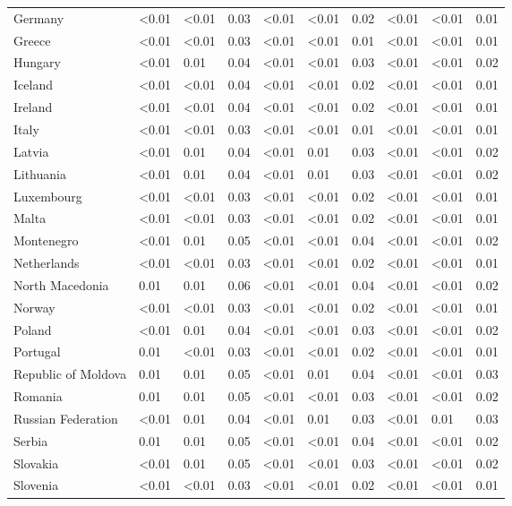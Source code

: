 \begin{longtable}[t]{llllllllll}
Germany & <0.01 & <0.01 & 0.03 & <0.01 & <0.01 & 0.02 & <0.01 & <0.01 & 0.01\\
Greece & <0.01 & <0.01 & 0.03 & <0.01 & <0.01 & 0.01 & <0.01 & <0.01 & 0.01\\
\addlinespace
Hungary & <0.01 & 0.01 & 0.04 & <0.01 & <0.01 & 0.03 & <0.01 & <0.01 & 0.02\\
Iceland & <0.01 & <0.01 & 0.04 & <0.01 & <0.01 & 0.02 & <0.01 & <0.01 & 0.01\\
Ireland & <0.01 & <0.01 & 0.04 & <0.01 & <0.01 & 0.02 & <0.01 & <0.01 & 0.01\\
Italy & <0.01 & <0.01 & 0.03 & <0.01 & <0.01 & 0.01 & <0.01 & <0.01 & 0.01\\
Latvia & <0.01 & 0.01 & 0.04 & <0.01 & 0.01 & 0.03 & <0.01 & <0.01 & 0.02\\
\addlinespace
Lithuania & <0.01 & 0.01 & 0.04 & <0.01 & 0.01 & 0.03 & <0.01 & <0.01 & 0.02\\
Luxembourg & <0.01 & <0.01 & 0.03 & <0.01 & <0.01 & 0.02 & <0.01 & <0.01 & 0.01\\
Malta & <0.01 & <0.01 & 0.03 & <0.01 & <0.01 & 0.02 & <0.01 & <0.01 & 0.01\\
Montenegro & <0.01 & 0.01 & 0.05 & <0.01 & <0.01 & 0.04 & <0.01 & <0.01 & 0.02\\
Netherlands & <0.01 & <0.01 & 0.03 & <0.01 & <0.01 & 0.02 & <0.01 & <0.01 & 0.01\\
\addlinespace
North Macedonia & 0.01 & 0.01 & 0.06 & <0.01 & <0.01 & 0.04 & <0.01 & <0.01 & 0.02\\
Norway & <0.01 & <0.01 & 0.03 & <0.01 & <0.01 & 0.02 & <0.01 & <0.01 & 0.01\\
Poland & <0.01 & 0.01 & 0.04 & <0.01 & <0.01 & 0.03 & <0.01 & <0.01 & 0.02\\
Portugal & 0.01 & <0.01 & 0.03 & <0.01 & <0.01 & 0.02 & <0.01 & <0.01 & 0.01\\
Republic of Moldova & 0.01 & 0.01 & 0.05 & <0.01 & 0.01 & 0.04 & <0.01 & <0.01 & 0.03\\
\addlinespace
Romania & 0.01 & 0.01 & 0.05 & <0.01 & <0.01 & 0.03 & <0.01 & <0.01 & 0.02\\
Russian Federation & <0.01 & 0.01 & 0.04 & <0.01 & 0.01 & 0.03 & <0.01 & 0.01 & 0.03\\
Serbia & 0.01 & 0.01 & 0.05 & <0.01 & <0.01 & 0.04 & <0.01 & <0.01 & 0.02\\
Slovakia & <0.01 & 0.01 & 0.05 & <0.01 & <0.01 & 0.03 & <0.01 & <0.01 & 0.02\\
Slovenia & <0.01 & <0.01 & 0.03 & <0.01 & <0.01 & 0.02 & <0.01 & <0.01 & 0.01\\

\end{longtable}
